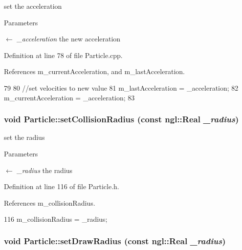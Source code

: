 set the acceleration 


\begin{DoxyParams}{Parameters}
\item[\mbox{$\leftarrow$} {\em \_\-acceleration}]the new acceleration \end{DoxyParams}


Definition at line 78 of file Particle.cpp.



References m\_\-currentAcceleration, and m\_\-lastAcceleration.




\begin{DoxyCode}
79 {
80     //set velocities to new value
81     m_lastAcceleration = _acceleration;
82     m_currentAcceleration = _acceleration;
83 }
\end{DoxyCode}


\hypertarget{class_particle_ad2926117bb4f364e653f0db90df6569c}{
\subsubsection[{setCollisionRadius}]{\setlength{\rightskip}{0pt plus 5cm}void Particle::setCollisionRadius (const ngl::Real {\em \_\-radius})}}
\label{class_particle_ad2926117bb4f364e653f0db90df6569c}


set the radius 


\begin{DoxyParams}{Parameters}
\item[\mbox{$\leftarrow$} {\em \_\-radius}]the radius \end{DoxyParams}


Definition at line 116 of file Particle.h.



References m\_\-collisionRadius.




\begin{DoxyCode}
116 { m_collisionRadius = _radius; }
\end{DoxyCode}


\hypertarget{class_particle_a642d3b2a89568e2b697fabb248684c2d}{
\subsubsection[{setDrawRadius}]{\setlength{\rightskip}{0pt plus 5cm}void Particle::setDrawRadius (const ngl::Real {\em \_\-radius})}}
\label{class_particle_a642d3b2a89568e2b697fabb248684c2d}


